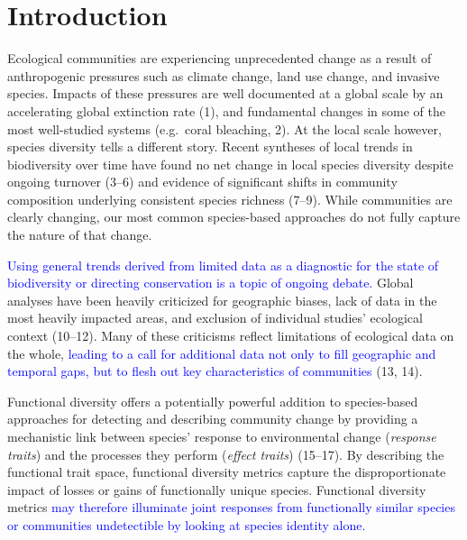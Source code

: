 \documentclass{article}
\begin{document}
\hypertarget{introduction}{%
\section{Introduction}\label{introduction}}

Ecological communities are experiencing unprecedented change as a result
of anthropogenic pressures such as climate change, land use change, and
invasive species. Impacts of these pressures are well documented at a
global scale by an accelerating global extinction rate (1), and
fundamental changes in some of the most well-studied systems (e.g.~coral
bleaching, 2). At the local scale however, species diversity tells a
different story. Recent syntheses of local trends in biodiversity over
time have found no net change in local species diversity despite ongoing
turnover (3--6) and evidence of significant shifts in community
composition underlying consistent species richness (7--9). While
communities are clearly changing, our most common species-based
approaches do not fully capture the nature of that change.

\textcolor{blue}{Using general trends derived from limited data as a diagnostic for the state of biodiversity or directing conservation is a topic of ongoing debate.}
Global analyses have been heavily criticized for geographic biases, lack
of data in the most heavily impacted areas, and exclusion of individual
studies' ecological context (10--12). Many of these criticisms reflect
limitations of ecological data on the whole,
\textcolor{blue}{leading to a call for additional data not only to fill geographic and temporal gaps, but to flesh out key characteristics of communities}
(13, 14).

Functional diversity offers a potentially powerful addition to
species-based approaches for detecting and describing community change
by providing a mechanistic link between species' response to
environmental change (\emph{response traits}) and the processes they
perform (\emph{effect traits}) (15--17). By describing the functional
trait space, functional diversity metrics capture the disproportionate
impact of losses or gains of functionally unique species. Functional
diversity metrics
\textcolor{blue}{may therefore illuminate joint responses from functionally similar species or communities undetectible by looking at species identity alone.}
\end{document}
